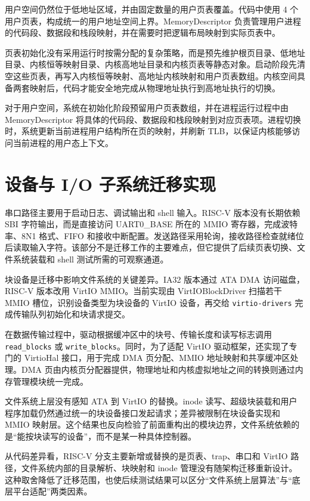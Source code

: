 用户空间仍然位于低地址区域，并由固定数量的用户页表覆盖。代码中使用 4 个用户页表，构成统一的用户地址空间上界。MemoryDescriptor 负责管理用户进程的代码段、数据段和栈段映射，并在需要时把逻辑布局映射到实际页表中。

页表初始化没有采用运行时按需分配的复杂策略，而是预先维护根页目录、低地址目录、内核恒等映射目录、内核高地址目录和内核页表等静态对象。启动阶段先清空这些页表，再写入内核恒等映射、高地址内核映射和用户页表数组。内核空间具备两套映射后，代码才能安全地完成从物理地址执行到高地址执行的切换。

对于用户空间，系统在初始化阶段预留用户页表数组，并在进程运行过程中由 MemoryDescriptor 将具体的代码段、数据段和栈段映射到对应页表项。进程切换时，系统更新当前进程用户结构所在页的映射，并刷新 TLB，以保证内核能够访问当前进程的用户态上下文。

\section{设备与 I/O 子系统迁移实现}

串口路径主要用于启动日志、调试输出和 shell 输入。RISC-V 版本没有长期依赖 SBI 字符输出，而是直接访问 UART0\_BASE 所在的 MMIO 寄存器，完成波特率、8N1 格式、FIFO 和接收中断配置。发送路径采用轮询，接收路径检查就绪位后读取输入字符。该部分不是迁移工作的主要难点，但它提供了后续页表切换、文件系统装载和 shell 测试所需的可观察通道。

块设备是迁移中影响文件系统的关键差异。IA32 版本通过 ATA DMA 访问磁盘，RISC-V 版本改用 VirtIO MMIO。当前实现由 VirtIOBlockDriver 扫描若干 MMIO 槽位，识别设备类型为块设备的 VirtIO 设备，再交给 \texttt{virtio-drivers} 完成传输队列初始化和块请求提交。

在数据传输过程中，驱动根据缓冲区中的块号、传输长度和读写标志调用 \texttt{read\_blocks} 或 \texttt{write\_blocks}。同时，为了适配 VirtIO 驱动框架，还实现了专门的 VirtioHal 接口，用于完成 DMA 页分配、MMIO 地址映射和共享缓冲区处理。DMA 页由内核页分配器提供，物理地址和内核虚拟地址之间的转换则通过内存管理模块统一完成。

文件系统上层没有感知 ATA 到 VirtIO 的替换。inode 读写、超级块装载和用户程序加载仍然通过统一的块设备接口发起请求；差异被限制在块设备实现和 MMIO 映射层。这个结果也反向检验了前面重构出的模块边界，文件系统依赖的是“能按块读写的设备”，而不是某一种具体控制器。

从代码差异看，RISC-V 分支主要新增或替换的是页表、trap、串口和 VirtIO 路径，文件系统内部的目录解析、块映射和 inode 管理没有随架构迁移重新设计。这种取舍降低了迁移范围，也使后续测试结果可以区分“文件系统上层算法”与“底层平台适配”两类因素。
